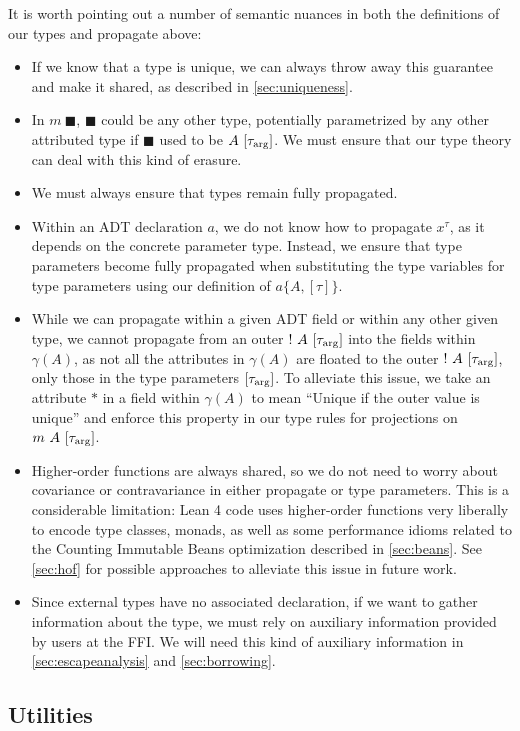 It is worth pointing out a number of semantic nuances in both the definitions of our types and propagate above:
\begin{itemize}
	\item If we know that a type is unique, we can always throw away this guarantee and make it shared, as described in \cref{sec:uniqueness}.
	\item In $m\ \blacksquare$, $\blacksquare$ could be any other type, potentially parametrized by any other attributed type if $\blacksquare$ used to be $A\ [\tau_{\mathrm{arg}}]$. We must ensure that our type theory can deal with this kind of erasure.
	\item We must always ensure that types remain fully propagated.
	\item Within an ADT declaration $a$, we do not know how to propagate $x^\tau$, as it depends on the concrete parameter type. Instead, we ensure that type parameters become fully propagated when substituting the type variables for type parameters using our definition of $a\{A, [\tau]\}$.
	\item While we can propagate within a given ADT field or within any other given type, we cannot propagate from an outer $!\ A\ [\tau_\arrg]$ into the fields within $\gamma(A)$, as not all the attributes in $\gamma(A)$ are floated to the outer $!\ A\ [\tau_\arrg]$, only those in the type parameters $[\tau_{\mathrm{arg}}]$. To alleviate this issue, we take an attribute $*$ in a field within $\gamma(A)$ to mean ``Unique if the outer value is unique'' and enforce this property in our type rules for projections on $m\ A\ [\tau_\arrg]$.
	\item Higher-order functions are always shared, so we do not need to worry about covariance or contravariance in either propagate or type parameters. This is a considerable limitation: Lean 4 code uses higher-order functions very liberally to encode type classes, monads, as well as some performance idioms related to the Counting Immutable Beans optimization described in \cref{sec:beans}. See \cref{sec:hof} for possible approaches to alleviate this issue in future work.
	\item Since external types have no associated declaration, if we want to gather information about the type, we must rely on auxiliary information provided by users at the FFI. We will need this kind of auxiliary information in \cref{sec:escapeanalysis} and \cref{sec:borrowing}.
\end{itemize}

\subsection{Utilities}

